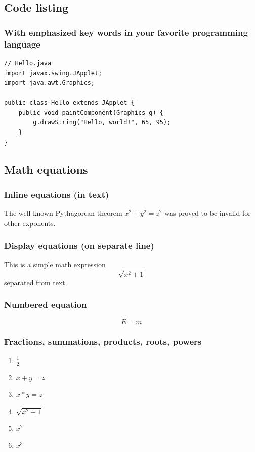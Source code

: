 \subsection{Code listing}

\subsubsection{With emphasized key words in your favorite programming language}

\begin{lstlisting}
// Hello.java
import javax.swing.JApplet;
import java.awt.Graphics;

public class Hello extends JApplet {
    public void paintComponent(Graphics g) {
        g.drawString("Hello, world!", 65, 95);
    }    
}
\end{lstlisting}

\subsection{Math equations}

\subsubsection{Inline equations (in text)}

The well known Pythagorean theorem \(x^2 + y^2 = z^2\) was 
proved to be invalid for other exponents.

\subsubsection{Display equations (on separate line)}

This is a simple math expression
\[\sqrt{x^2+1}\] 
separated from text.

\subsubsection{Numbered equation}
\begin{equation}
E=m
\end{equation}

\subsubsection{Fractions, summations, products, roots, powers}

\begin{enumerate}
    \item \(\frac{1}{2}\)
    \item \(x + y = z\)
    \item \(x * y = z\)
    \item \(\sqrt{x^2+1}\) 
    \item \begin{math}{x^2}\end{math}
    \item \({x^3}\)
\end{enumerate}

